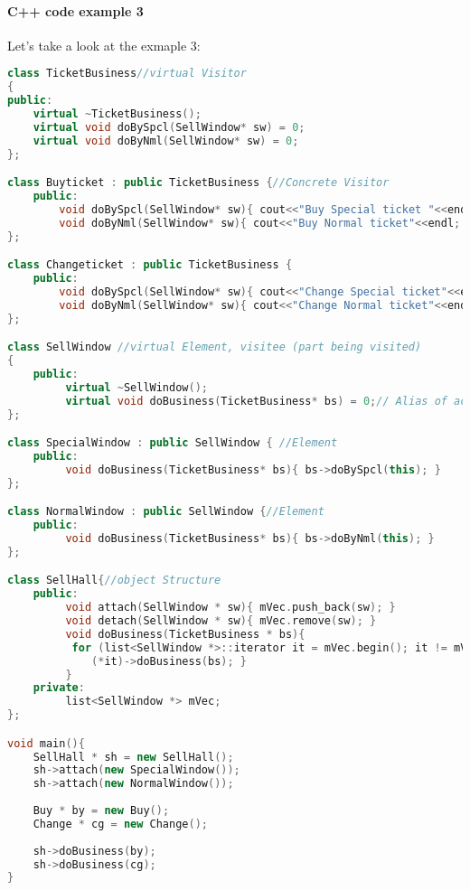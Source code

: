 \documentclass{book}
\begin{document}
\begin{figure}[H]
\begin{floatrow}
\end{floatrow}
\end{figure}



\paragraph{C++ code example 3}
Let's take a look at the exmaple 3:
\begin{lstlisting}[caption={visitor pattern sample code 3},label={lst:vps3},language=C++]
class TicketBusiness//virtual Visitor
{
public:
    virtual ~TicketBusiness();
    virtual void doBySpcl(SellWindow* sw) = 0;
    virtual void doByNml(SellWindow* sw) = 0;
};

class Buyticket : public TicketBusiness {//Concrete Visitor
    public:
        void doBySpcl(SellWindow* sw){ cout<<"Buy Special ticket "<<endl;}
        void doByNml(SellWindow* sw){ cout<<"Buy Normal ticket"<<endl; }
};

class Changeticket : public TicketBusiness {
    public:
        void doBySpcl(SellWindow* sw){ cout<<"Change Special ticket"<<endl; }
        void doByNml(SellWindow* sw){ cout<<"Change Normal ticket"<<endl; }
};

class SellWindow //virtual Element, visitee (part being visited)
{
    public:
         virtual ~SellWindow();
         virtual void doBusiness(TicketBusiness* bs) = 0;// Alias of accept()
};

class SpecialWindow : public SellWindow { //Element
    public:
         void doBusiness(TicketBusiness* bs){ bs->doBySpcl(this); }
};

class NormalWindow : public SellWindow {//Element
    public:
         void doBusiness(TicketBusiness* bs){ bs->doByNml(this); }
};

class SellHall{//object Structure
    public:
         void attach(SellWindow * sw){ mVec.push_back(sw); }
         void detach(SellWindow * sw){ mVec.remove(sw); }
         void doBusiness(TicketBusiness * bs){
          for (list<SellWindow *>::iterator it = mVec.begin(); it != mVec.end(); it++){
             (*it)->doBusiness(bs); }
         }
    private:
         list<SellWindow *> mVec;
};

void main(){
    SellHall * sh = new SellHall();
    sh->attach(new SpecialWindow());
    sh->attach(new NormalWindow());
    
    Buy * by = new Buy();
    Change * cg = new Change();
    
    sh->doBusiness(by);
    sh->doBusiness(cg);
}
\end{lstlisting}
\end{document}
